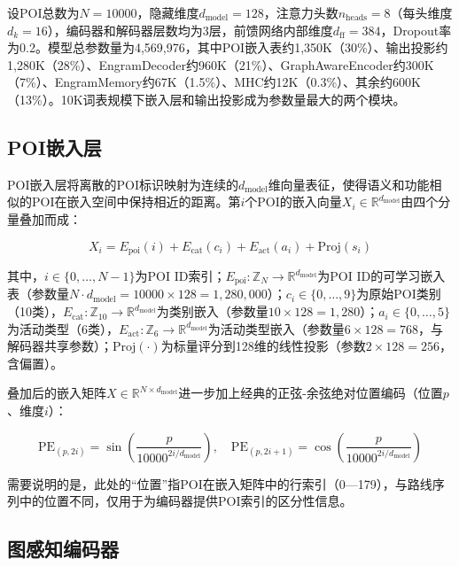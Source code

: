 \documentclass[12pt,a4paper]{ctexart}
\begin{document}
设POI总数为$N=10000$，隐藏维度$d_{\text{model}}=128$，注意力头数$n_{\text{heads}}=8$（每头维度$d_k=16$），编码器和解码器层数均为3层，前馈网络内部维度$d_{\text{ff}}=384$，Dropout率为0.2。模型总参数量为4,569,976，其中POI嵌入表约1,350K（30\%）、输出投影约1,280K（28\%）、EngramDecoder约960K（21\%）、GraphAwareEncoder约300K（7\%）、EngramMemory约67K（1.5\%）、MHC约12K（0.3\%）、其余约600K（13\%）。10K词表规模下嵌入层和输出投影成为参数量最大的两个模块。

\subsection{POI嵌入层}

POI嵌入层将离散的POI标识映射为连续的$d_{\text{model}}$维向量表征，使得语义和功能相似的POI在嵌入空间中保持相近的距离。第$i$个POI的嵌入向量$X_i\in\mathbb{R}^{d_{\text{model}}}$由四个分量叠加而成：

\begin{equation}
X_i = E_{\text{poi}}(i) + E_{\text{cat}}(c_i) + E_{\text{act}}(a_i) + \text{Proj}(s_i)
\label{eq:poi_embed}
\end{equation}

其中，$i\in\{0,\dots,N-1\}$为POI ID索引；$E_{\text{poi}}:\mathbb{Z}_N\rightarrow\mathbb{R}^{d_{\text{model}}}$为POI ID的可学习嵌入表（参数量$N\cdot d_{\text{model}}=10000\times128=1,280,000$）；$c_i\in\{0,\dots,9\}$为原始POI类别（10类），$E_{\text{cat}}:\mathbb{Z}_{10}\rightarrow\mathbb{R}^{d_{\text{model}}}$为类别嵌入（参数量$10\times128=1,280$）；$a_i\in\{0,\dots,5\}$为活动类型（6类），$E_{\text{act}}:\mathbb{Z}_6\rightarrow\mathbb{R}^{d_{\text{model}}}$为活动类型嵌入（参数量$6\times128=768$，与解码器共享参数）；$\text{Proj}(\cdot)$为标量评分到128维的线性投影（参数$2\times128=256$，含偏置）。

叠加后的嵌入矩阵$X\in\mathbb{R}^{N\times d_{\text{model}}}$进一步加上经典的正弦-余弦绝对位置编码（位置$p$、维度$i$）：

\begin{equation}
\text{PE}_{(p,2i)}=\sin\!\left(\frac{p}{10000^{2i/d_{\text{model}}}}\right),\quad
\text{PE}_{(p,2i+1)}=\cos\!\left(\frac{p}{10000^{2i/d_{\text{model}}}}\right)
\end{equation}

需要说明的是，此处的“位置”指POI在嵌入矩阵中的行索引（0—179），与路线序列中的位置不同，仅用于为编码器提供POI索引的区分性信息。

\subsection{图感知编码器}
\end{document}
